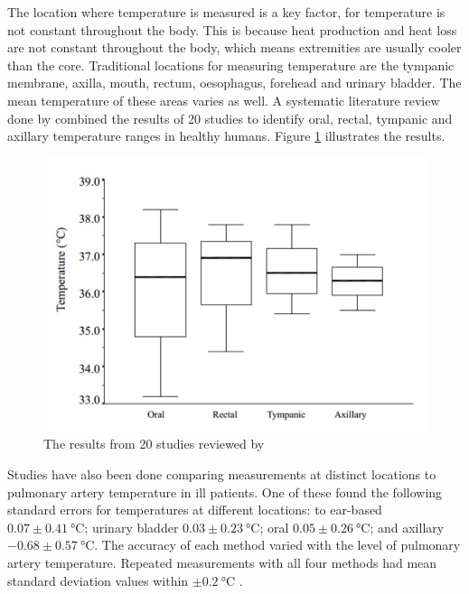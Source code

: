 \medskip
The location where temperature is measured is a key factor, for temperature is not constant throughout the body. This is because heat production and heat loss are not constant throughout the body, which means extremities are usually cooler than the core. Traditional locations for measuring temperature are the tympanic membrane, axilla, mouth, rectum, oesophagus, forehead and urinary bladder. The mean temperature of these areas varies as well. A systematic literature review done by \cite{sund2002normal} combined the results of 20 studies to identify oral, rectal, tympanic and axillary temperature ranges in healthy humans. Figure \ref{fig:VariationsInTemp} illustrates the results.

 \begin{figure}
   \centering
   \includegraphics[scale=0.3]{figs/VariationsInTemp}
   \caption{The results from 20 studies reviewed by \cite{sund2002normal}}
   \label{fig:VariationsInTemp}
\end{figure}

\medskip
Studies have also been done comparing measurements at distinct locations to pulmonary artery temperature in ill patients. One of these found the following standard errors for temperatures at different locations: to ear-based  $0.07\pm \SI{0.41}{\celsius}$; urinary bladder  $0.03\pm \SI{0.23}{\celsius}$; oral  $0.05\pm \SI{0.26}{\celsius}$; and axillary $-0.68\pm \SI{0.57}{\celsius}$. The accuracy of each method varied with the level of pulmonary artery temperature. Repeated measurements with all four methods had mean standard deviation values within $\pm \SI{0.2}{\celsius}$ \citep{erickson1993comparison}.


